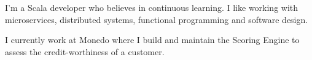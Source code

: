 

\begin{cvparagraph}

I'm a Scala developer who believes in continuous learning. I like working with microservices, distributed systems, functional programming and software design.

I currently work at Monedo where I build and maintain the Scoring Engine to assess the credit-worthiness of a customer. 
\end{cvparagraph}
